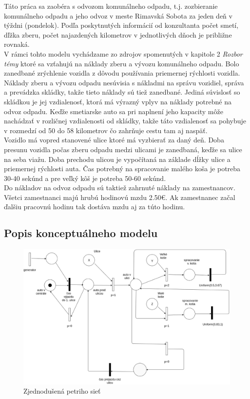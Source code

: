 \documentclass[11pt,a4paper]{article}
\begin{document}
    \indent Táto práca sa zaobéra s odvozom komunálneho odpadu, t.j. zozbieranie komunálneho odpadu a jeho odvoz v meste Rimavská Sobota za jeden deň v týždni (pondelok). Podľa poskytnutých informácií od konzultanta počet smetí, dľžka zberu, počet najazdených kilometrov v jednotlivých dňoch je približne rovnaká.\\[0.4em]
    \indent V rámci tohto modelu vychádzame zo zdrojov spomenutých v kapitole 2 \textit{Rozbor témy} ktoré sa vzťahujú na náklady zberu a vývozu komunálneho odpadu. Bolo zanedbané zrýchlenie vozidla z dôvodu používania priemernej rýchlosti vozidla. Náklady zberu a vývozu odpadu nesúvisia s nákladmi na správu vozidiel, správa a prevádzka skládky, takže tieto náklady sú tiež zanedbané. Jediná súvislosť so skládkou je jej vzdialenosť, ktorá má výrazný vplyv na náklady potrebné na odvoz odpadu. Keďže smetiarske auto sa pri naplnení jeho kapacity môže nachádzať v rozličnej vzdialenosti od skládky, takže táto vzdialenosť sa pohybuje v rozmedzí od 50 do 58 kilometrov čo zahrňuje cestu tam aj naspäť.\\[0.4em]
    \indent Vozidlo má vopred stanovené ulice ktoré má vyzbierať za daný deň. Doba presunu vozidla počas zberu odpadu medzi ulicami je zanedbaná, keďže sa ulice na seba viažu. Doba prechodu ulicou je vypočítaná na základe dĺžky ulice a priemernej rýchlosti auta. Čas potrebný na spracovanie malého koša je potreba 30-40 sekúnd a pre veľký kôš je potreba 50-60 sekúnd.\\[0.4em]
    \indent Do nákladov na odvoz odpadu sú taktiež zahrnuté náklady na zamestnancov. Všetci zamestnanci majú hrubú hodinovú mzdu 2.50\euro{}. Ak zamestnanec začal ďalšiu pracovnú hodinu tak dostáva mzdu aj za túto hodinu.

    \subsection{Popis konceptuálneho modelu}

\begin{figure}[H]
    \center
    \includegraphics[scale=0.3]{../pn/petrinet-small.eps}
    \caption{Zjednodušená petriho sieť}
    \label{P}
\end{figure}
\end{document}
